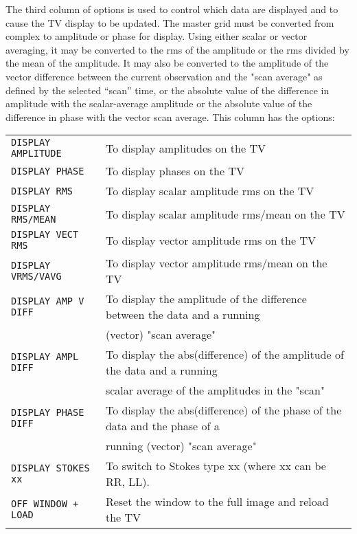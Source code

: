 \documentclass[twoside]{article}
\begin{document}
The third column of options is used to control which data are displayed
and to cause the TV display to be updated.  The master grid must be
converted from complex to amplitude or phase for display.  Using
either scalar or vector averaging, it may be converted to the rms of
the amplitude or the rms divided by the mean of the amplitude.  It may
also be converted to the amplitude of the vector difference between
the current observation and the "scan average" as defined by the
selected ``scan'' time, or the absolute value of the difference in
amplitude with the scalar-average amplitude or the absolute value of
the difference in phase with the vector scan average.  This column has
the options:

\begin{center}
\begin{tabular}{|l|l|}\hline
{\tt DISPLAY AMPLITUDE  } & To display amplitudes on the TV\\
{\tt DISPLAY PHASE      } & To display phases on the TV\\
{\tt DISPLAY RMS        } & To display scalar amplitude rms on the TV\\
{\tt DISPLAY RMS/MEAN   } & To display scalar amplitude rms/mean on the TV\\
{\tt DISPLAY VECT RMS   } & To display vector amplitude rms on the TV\\
{\tt DISPLAY VRMS/VAVG  } & To display vector amplitude rms/mean on the TV\\
{\tt DISPLAY AMP V DIFF } & To display the amplitude of the difference
                         between the data and a running\\
                          &  (vector) "scan average"\\
{\tt DISPLAY AMPL DIFF  } & To display the abs(difference) of the amplitude
                         of the data and a running\\
                          & scalar average of the amplitudes in the "scan"\\
{\tt DISPLAY PHASE DIFF } & To display the abs(difference) of the phase of
                         the data and the phase of a\\
                          & running (vector) "scan average"\\
{\tt DISPLAY STOKES xx  } & To switch to Stokes type xx (where xx can be
                         RR, LL).\\
{\tt OFF WINDOW + LOAD  } & Reset the window to the full image and reload
                         the TV\\

\end{tabular}
\end{center}
\end{document}
